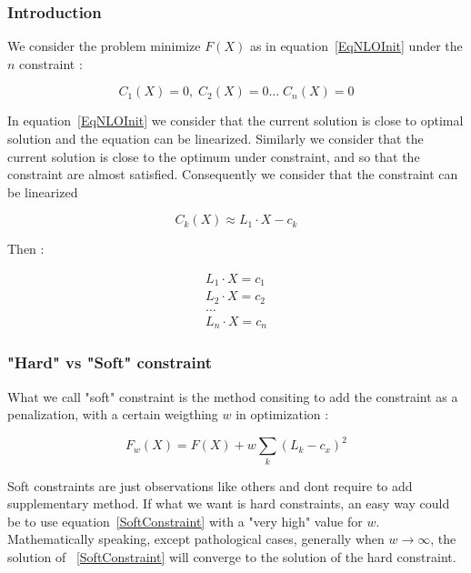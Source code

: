 \subsubsection{Introduction}

We consider the problem minimize $F(X)$ as in equation~\ref{EqNLOInit} under
the $n$ constraint :

\begin{equation}
	C_1(X) =0, \; C_2(X)=0 \dots \;  C_n(X)=0
\end{equation}

In  equation~\ref{EqNLOInit} we consider that the current solution is
close to optimal solution and the equation can be linearized.
Similarly we consider that the current solution is close to the 
optimum under constraint, and so that the constraint are almost satisfied.
Consequently we consider that the constraint can be linearized 

\begin{equation} 
C_k(X) \approx L_1 \cdot X  - c_k
\end{equation} 

Then :

\begin{equation} 
\begin{split}
  L_1 \cdot X = c_1 \\
  L_2 \cdot X = c_2 \\
    \dots \\
  L_n \cdot X = c_n 
\end{split}
\end{equation}


\subsubsection{"Hard" vs "Soft" constraint}

What we call "soft" constraint is the method consiting to add
the constraint as a penalization, with a certain weigthing $w$  in optimization  :

\begin{equation}
    F_w(X) = F(X) + w  \sum_k (L_k-c_x)^2 \label{SoftConstraint}
\end{equation}

Soft constraints are just observations like others and dont require
to add supplementary method. If what we want is hard constraints, an
easy way could be to use equation~\ref{SoftConstraint} with a "very high"
value for $w$.   Mathematically speaking, except pathological cases,
generally when $w \rightarrow \infty$, the solution of ~\ref{SoftConstraint}
will converge to the solution of the hard constraint.

